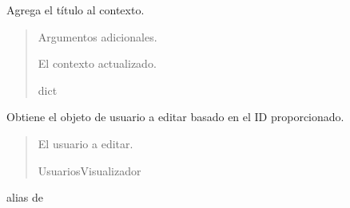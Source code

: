 \documentclass[letterpaper,10pt,spanish]{sphinxmanual}
\begin{document}
\begin{fulllineitems}
\begin{fulllineitems}

\pysigstartsignatures
{}
\pysigstopsignatures
\sphinxAtStartPar
Agrega el título al contexto.
\begin{quote}\begin{description}
\sphinxAtStartPar
{} \textendash{} Argumentos adicionales.

\sphinxAtStartPar
El contexto actualizado.

\sphinxAtStartPar
dict

\end{description}\end{quote}

\end{fulllineitems}



\begin{fulllineitems}

\pysigstartsignatures
{}
\pysigstopsignatures
\sphinxAtStartPar
Obtiene el objeto de usuario a editar basado en el ID proporcionado.
\begin{quote}\begin{description}
\sphinxAtStartPar
El usuario a editar.

\sphinxAtStartPar
UsuariosVisualizador

\end{description}\end{quote}

\end{fulllineitems}



\begin{fulllineitems}

\pysigstartsignatures
{}
\pysigstopsignatures
\sphinxAtStartPar
alias de 

\end{fulllineitems}



\begin{fulllineitems}


\end{fulllineitems}
\end{fulllineitems}
\end{document}
